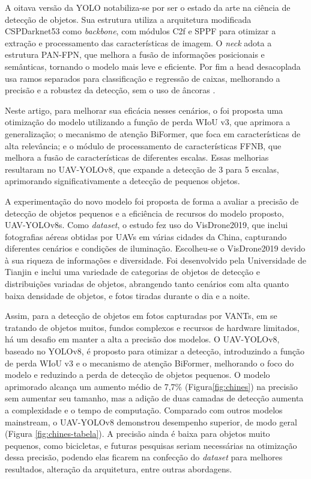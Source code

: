 A oitava versão da YOLO notabiliza-se por ser o estado da arte na ciência de detecção de objetos. Sua estrutura utiliza a arquitetura modificada CSPDarknet53 como \textit{backbone}, com módulos C2f e SPPF para otimizar a extração e processamento das características de imagem. O \textit{neck} adota a estrutura PAN-FPN, que melhora a fusão de informações posicionais e semânticas, tornando o modelo mais leve e eficiente. Por fim a head desacoplada usa ramos separados para classificação e regressão de caixas, melhorando a precisão e a robustez da detecção, sem o uso de âncoras \cite{redmon2018yolov3}.

Neste artigo, para melhorar sua eficácia nesses cenários, o foi proposta uma otimização do modelo utilizando a função de perda WIoU v3, que aprimora a generalização; o mecanismo de atenção BiFormer, que foca em características de alta relevância; e o módulo de processamento de características FFNB, que melhora a fusão de características de diferentes escalas. Essas melhorias resultaram no UAV-YOLOv8, que expande a detecção de 3 para 5 escalas, aprimorando significativamente a detecção de pequenos objetos.

A experimentação do novo modelo foi proposta de forma a avaliar a precisão de detecção de objetos pequenos e a eficiência de recursos do modelo proposto, UAV-YOLOv8s. Como \textit{dataset}, o estudo fez uso do VisDrone2019, que inclui fotografias aéreas obtidas por UAVs em várias cidades da China, capturando diferentes cenários e condições de iluminação. Escolheu-se o VisDrone2019 devido à sua riqueza de informações e diversidade. Foi desenvolvido pela Universidade de Tianjin e inclui uma variedade de categorias de objetos de detecção e distribuições variadas de objetos, abrangendo tanto cenários com alta quanto baixa densidade de objetos, e fotos tiradas durante o dia e a noite.

Assim, para a detecção de objetos em fotos capturadas por VANTs, em se tratando de objetos muitos, fundos complexos e recursos de hardware limitados, há um desafio em manter a alta a precisão dos modelos. O UAV-YOLOv8, baseado no YOLOv8, é proposto para otimizar a detecção, introduzindo a função de perda WIoU v3 e o mecanismo de atenção BiFormer, melhorando o foco do modelo e reduzindo a perda de detecção de objetos pequenos. O modelo aprimorado alcança um aumento médio de 7,7\% (Figura\ref{fig:chines}) na precisão sem aumentar seu tamanho, mas a adição de duas camadas de detecção aumenta a complexidade e o tempo de computação. Comparado com outros modelos mainstream, o UAV-YOLOv8 demonstrou desempenho superior, de modo geral (Figura \ref{fig:chines-tabela}). A precisão ainda é baixa para objetos muito pequenos, como bicicletas, e futuras pesquisas seriam necessárias na otimização dessa precisão, podendo elas ficarem na confecção do \textit{dataset} para melhores resultados, alteração da arquitetura, entre outras abordagens.

